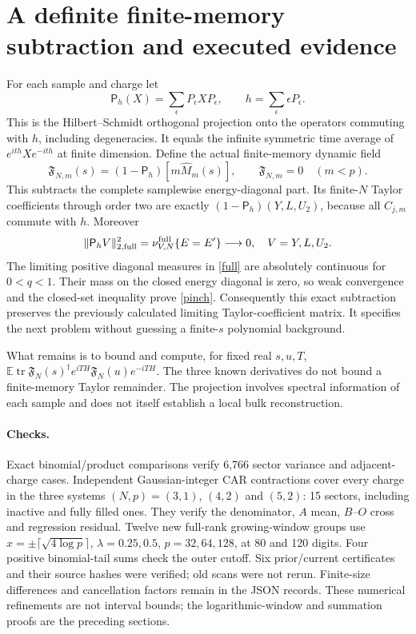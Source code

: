 \documentclass[11pt,a4paper]{article}
\newcommand{\EE}{\mathbb E}
\newcommand{\tr}{\operatorname{tr}}
\begin{document}
\section{A definite finite-memory subtraction and executed evidence}
For each sample and charge let
\begin{equation}
 \mathsf P_h(X)=\sum_{\epsilon}P_\epsilon XP_\epsilon,
 \qquad h=\sum_\epsilon\epsilon P_\epsilon.
\end{equation}
This is the Hilbert--Schmidt orthogonal projection onto the
operators commuting with $h$, including degeneracies. It equals
the infinite symmetric time average of $e^{ith}Xe^{-ith}$ at
finite dimension. Define the actual finite-memory dynamic field
\begin{equation}
 \mathfrak F_{N,m}(s)=(1-\mathsf P_h)[m\widehat M_m(s)],\qquad
 \mathfrak F_{N,m}=0\quad(m<p).
\end{equation}
This subtracts the complete samplewise energy-diagonal part.
Its finite-$N$ Taylor coefficients through order two are exactly
$(1-\mathsf P_h)(Y,L,U_2)$, because all $C_{j,m}$ commute with $h$.
Moreover
\begin{equation}
 \|\mathsf P_hV\|_{2,\rm full}^2
 =\nu_{V,N}^{\rm full}\{E=E'\}\longrightarrow0,
 \quad V=Y,L,U_2.\label{pinch}
\end{equation}
The limiting positive diagonal measures in \eqref{full} are
absolutely continuous for $0<q<1$. Their mass on the closed
energy diagonal is zero, so weak convergence and the closed-set
inequality prove \eqref{pinch}. Consequently this exact subtraction
preserves the previously calculated limiting Taylor-coefficient
matrix. It specifies the next problem without guessing a
finite-$s$ polynomial background.

What remains is to bound and compute, for fixed real $s,u,T$,
$\EE\tr\mathfrak F_N(s)^\dagger e^{iTH}\mathfrak F_N(u)e^{-iTH}$.
The three known derivatives do not bound a finite-memory Taylor
remainder. The projection involves spectral information of each
sample and does not itself establish a local bulk reconstruction.

\paragraph{Checks.}
Exact binomial/product comparisons verify 6,766 sector variance
and adjacent-charge cases. Independent Gaussian-integer CAR
contractions cover every charge in the three systems
$(N,p)=(3,1)$, $(4,2)$ and $(5,2)$:
15 sectors, including inactive and fully filled ones. They verify
the denominator, $A$ mean, $B$--$O$ cross and regression residual.
Twelve new full-rank growing-window groups use
$x=\pm\lceil\sqrt{4\log p}\rceil$, $\lambda=0.25,0.5$,
$p=32,64,128$, at 80 and 120 digits. Four positive binomial-tail
sums check the outer cutoff. Six prior/current certificates and
their source hashes were verified; old scans were not rerun.
Finite-size differences and cancellation factors remain in the
JSON records. These numerical refinements are not interval bounds;
the logarithmic-window and summation proofs are the preceding sections.
\end{document}
